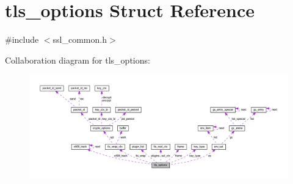 \hypertarget{structtls__options}{}\section{tls\+\_\+options Struct Reference}
\label{structtls__options}


{\ttfamily \#include $<$ssl\+\_\+common.\+h$>$}



Collaboration diagram for tls\+\_\+options\+:
\nopagebreak
\begin{figure}[H]
\begin{center}
\leavevmode
\includegraphics[width=350pt]{structtls__options__coll__graph}
\end{center}
\end{figure}
